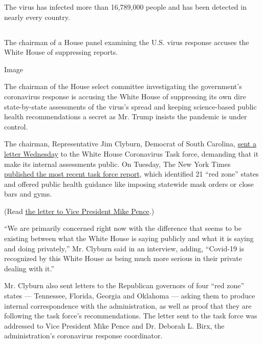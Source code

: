 The virus has infected more than 16,789,000 people and has been detected
in nearly every country.

\hypertarget{-4}{%
\subsection{}\label{-4}}

The chairman of a House panel examining the U.S. virus response accuses
the White House of suppressing reports.

Image

The chairman of the House select committee investigating the
government's coronavirus response is accusing the White House of
suppressing its own dire state-by-state assessments of the virus's
spread and keeping science-based public health recommendations a secret
as Mr. Trump insists the pandemic is under control.

The chairman, Representative Jim Clyburn, Democrat of South Carolina,
\href{https://int.nyt.com/data/documenttools/clyburn-letter-to-pence/5eaf7827a6dbb331/full.pdf}{sent
a letter Wednesday} to the White House Coronavirus Task force, demanding
that it make its internal assessments public. On Tuesday, The New York
Times
\href{https://www.nytimes.com/interactive/2020/07/28/us/states-report-virus-response-july-26.html}{published
the most recent task force report}, which identified 21 ``red zone''
states and offered public health guidance like imposing statewide mask
orders or close bars and gyms.

(Read
\href{https://int.nyt.com/data/documenttools/clyburn-letter-to-pence/5eaf7827a6dbb331/full.pdf}{the
letter to Vice President Mike Pence}.)

``We are primarily concerned right now with the difference that seems to
be existing between what the White House is saying publicly and what it
is saying and doing privately,'' Mr. Clyburn said in an interview,
adding, ``Covid-19 is recognized by this White House as being much more
serious in their private dealing with it.''

Mr. Clyburn also sent letters to the Republican governors of four ``red
zone'' states --- Tennessee, Florida, Georgia and Oklahoma --- asking
them to produce internal correspondence with the administration, as well
as proof that they are following the task force's recommendations. The
letter sent to the task force was addressed to Vice President Mike Pence
and Dr. Deborah L. Birx, the administration's coronavirus response
coordinator.

